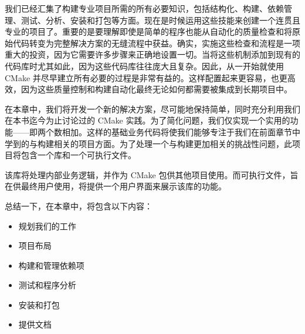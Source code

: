 我们已经汇集了构建专业项目所需的所有必要知识，包括结构化、构建、依赖管理、测试、分析、安装和打包等方面。现在是时候运用这些技能来创建一个连贯且专业的项目了。重要的是要理解即使是简单的程序也能从自动化的质量检查和将原始代码转变为完整解决方案的无缝流程中获益。确实，实施这些检查和流程是一项重大的投资，因为它需要许多步骤来正确地设置一切。当将这些机制添加到现有的代码库时尤其如此，因为这些代码库往往庞大且复杂。因此，从一开始就使用 CMake 并尽早建立所有必要的过程是非常有益的。这样配置起来更容易，也更高效，因为这些质量控制和构建自动化最终无论如何都需要被集成到长期项目中。

在本章中，我们将开发一个新的解决方案，尽可能地保持简单，同时充分利用我们在本书迄今为止讨论过的 CMake 实践。为了简化问题，我们仅实现一个实用的功能——即两个数相加。这样的基础业务代码将使我们能够专注于我们在前面章节中学到的与构建相关的项目方面。为了处理一个与构建更加相关的挑战性问题，此项目将包含一个库和一个可执行文件。

该库将处理内部业务逻辑，并作为 CMake 包供其他项目使用。而可执行文件，旨在供最终用户使用，将提供一个用户界面来展示该库的功能。

总结一下，在本章中，将包含以下内容：

\begin{itemize}
\item
规划我们的工作

\item
项目布局

\item
构建和管理依赖项

\item
测试和程序分析

\item
安装和打包

\item
提供文档
\end{itemize}